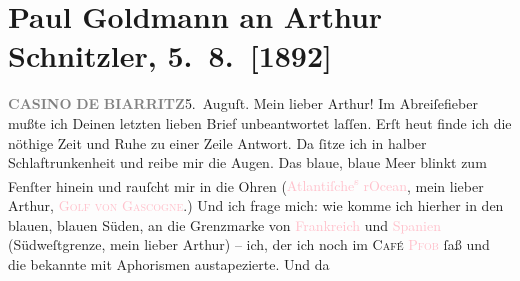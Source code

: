 

               \section[Paul Goldmann an Arthur Schnitzler, 5. 8. {[}1892{]}]{ Paul Goldmann an Arthur Schnitzler, 5. 8. {[}1892{]}}\nopagebreak{}\rehead{ }\normalsize\beginnumbering{} \toendnotes[C]{\smallbreak\pagebreak[2]} 
\toendnotes[C]{\smallbreak}\pstart
           \noindent{}{\pb}\textcolor{brown}{\textcolor{gray}{\textbf{CASINO}}}{}\ledrightnote{\textcolor{brown}{Casino de Biarritz}}\pend
           \pstart
           \textcolor{brown}{\textcolor{gray}{\textbf{DE}}}{}\ledrightnote{\textcolor{brown}{Casino de Biarritz}}\pend
           \pstart
           \textcolor{brown}{\textcolor{gray}{\textbf{BIARRITZ}}}{}\ledrightnote{\textcolor{brown}{Casino de Biarritz}}\hfill 5. Auguſt. \pend
           \pstart\center{}Mein lieber Arthur!\pend\pstart
           Im Abreiſefieber mußte ich Deinen letzten lieben Brief unbeantwortet laſſen. Erſt
                  heut finde ich die nöthige Zeit und Ruhe zu einer
               Zeile Antwort. Da ſitze ich in halber Schlaftrunkenheit und reibe mir die Augen. Das
               blaue, blaue Meer blinkt zum Fenſter hinein und rauſcht mir in die Ohren (\textcolor{pink}{Atlantiſche\substVorne{}\textsuperscript{s }\substDazwischen{}r\substHinten{}{ }{\pb}Ocean}{}\ledrightnote{\textcolor{pink}{Atlantischer Ozean}}, mein lieber Arthur, \textsc{\textcolor{pink}{Golf von Gascogne}{}\ledrightnote{\textcolor{pink}{Biskaya}}}.) Und ich frage mich: wie  komme ich hierher
               in den blauen, blauen Süden,  an die Grenzmarke
               von \textcolor{pink}{Frankreich}{}\ledrightnote{\textcolor{pink}{Frankreich}} und \textcolor{pink}{Spanien}{}\ledrightnote{\textcolor{pink}{Spanien}}{ } (Südweſtgrenze, mein lieber Arthur) – ich, der
               ich \label{K_L02701-44v}\label{K_L02701-44h} noch im \textsc{Café \textcolor{pink}{Pfob}{}\ledrightnote{\textcolor{pink}{Café Pfob}}} ſaß und die bekannte \label{K_L02701-1v}\label{K_L02701-1h} mit Aphorismen austapezierte. Und da
